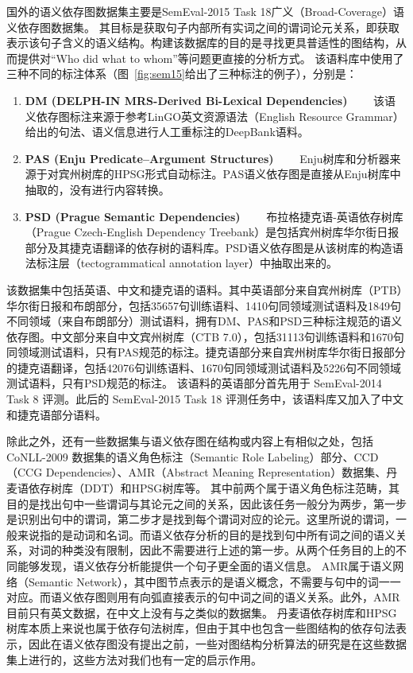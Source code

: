 国外的语义依存图数据集主要是SemEval-2015 Task 18广义（Broad-Coverage）语义依存图数据集。
其目标是获取句子内部所有实词之间的谓词论元关系，即获取表示该句子含义的语义结构。构建该数据库的目的是寻找更具普适性的图结构，从而提供对“Who did what to whom”等问题更直接的分析方式。
该语料库中使用了三种不同的标注体系（图~\ref{fig:sem15}给出了三种标注的例子），分别是：

\begin{enumerate}
\item \textbf{DM (DELPH-IN MRS-Derived Bi-Lexical Dependencies)}
\ \ \ \ 该语义依存图标注来源于参考LinGO英文资源语法（English Resource Grammar）给出的句法、语义信息进行人工重标注的DeepBank语料。
	
\item \textbf{PAS (Enju Predicate–Argument Structures)}
\ \ \ \ Enju树库和分析器来源于对宾州树库的HPSG形式自动标注。PAS语义依存图是直接从Enju树库中抽取的，没有进行内容转换。
	
\item \textbf{PSD (Prague Semantic Dependencies)}
\ \ \ \ 布拉格捷克语-英语依存树库（Prague Czech-English Dependency Treebank）是包括宾州树库华尔街日报部分及其捷克语翻译的依存树的语料库。PSD语义依存图是从该树库的构造语法标注层（tectogrammatical annotation layer）中抽取出来的。
\end{enumerate} 

该数据集中包括英语、中文和捷克语的语料。其中英语部分来自宾州树库（PTB）华尔街日报和布朗部分，包括35657句训练语料、1410句同领域测试语料及1849句不同领域（来自布朗部分）测试语料，拥有DM、PAS和PSD三种标注规范的语义依存图。中文部分来自中文宾州树库（CTB 7.0），包括31113句训练语料和1670句同领域测试语料，只有PAS规范的标注。捷克语部分来自宾州树库华尔街日报部分的捷克语翻译，包括42076句训练语料、1670句同领域测试语料及5226句不同领域测试语料，只有PSD规范的标注。 
该语料的英语部分首先用于 SemEval-2014 Task 8 评测。此后的 SemEval-2015 Task 18 评测任务中，该语料库又加入了中文和捷克语部分语料。

除此之外，还有一些数据集与语义依存图在结构或内容上有相似之处，包括 CoNLL-2009 数据集的语义角色标注（Semantic Role Labeling）部分、CCD（CCG Dependencies）、AMR（Abstract Meaning Representation）数据集、丹麦语依存树库（DDT）和HPSG树库等。
其中前两个属于语义角色标注范畴，其目的是找出句中一些谓词与其论元之间的关系，因此该任务一般分为两步，第一步是识别出句中的谓词，第二步才是找到每个谓词对应的论元。这里所说的谓词，一般来说指的是动词和名词。而语义依存分析的目的是找到句中所有词之间的语义关系，对词的种类没有限制，因此不需要进行上述的第一步。从两个任务目的上的不同能够发现，语义依存分析能提供一个句子更全面的语义信息。
AMR属于语义网络（Semantic Network），其中图节点表示的是语义概念，不需要与句中的词一一对应。而语义依存图则用有向弧直接表示的句中词之间的语义关系。此外，AMR目前只有英文数据，在中文上没有与之类似的数据集。
丹麦语依存树库和HPSG树库本质上来说也属于依存句法树库，但由于其中也包含一些图结构的依存句法表示，因此在语义依存图没有提出之前，一些对图结构分析算法的研究是在这些数据集上进行的，这些方法对我们也有一定的启示作用。

